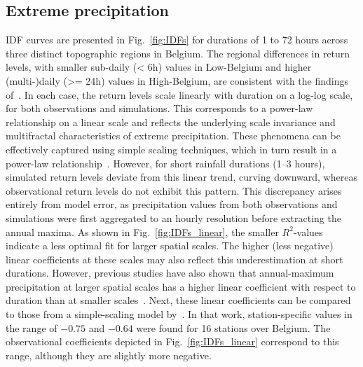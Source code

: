 \documentclass[journal abbreviation, manuscript]{copernicus}
\begin{document}
\subsection{Extreme precipitation}

IDF curves are presented in Fig.~\ref{fig:IDFs} for durations of 1 to 72 hours across three distinct topographic regions in Belgium.
The regional differences in return levels, with smaller sub-daily (< 6h) values in Low-Belgium and higher (multi-)daily (>= 24h) values in High-Belgium, are consistent with the findings of~\citet{van_de_vyver_practical_2013}.
In each case, the return levels scale linearly with duration on a log-log scale, for both observations and simulations.
This corresponds to a power-law relationship on a linear scale and reflects the underlying scale invariance and multifractal characteristics of extreme precipitation.
These phenomena can be effectively captured using simple scaling techniques, which in turn result in a power-law relationship~\citep{gupta_multiscaling_1990, veneziano_multifractality_2002}.
However, for short rainfall durations (1--3 hours), simulated return levels deviate from this linear trend, curving downward, whereas observational return levels do not exhibit this pattern.
This discrepancy arises entirely from model error, as precipitation values from both observations and simulations were first aggregated to an hourly resolution before extracting the annual maxima.
As shown in Fig.~\ref{fig:IDFs_linear}, the smaller $R^2$-values indicate a less optimal fit for larger spatial scales.
The higher (less negative) linear coefficients at these scales may also reflect this underestimation at short durations.
However, previous studies have also shown that annual-maximum precipitation at larger spatial scales has a higher linear coefficient with respect to duration than at smaller scales~\citep{innocenti_observed_2019}.
Next, these linear coefficients can be compared to those from a simple-scaling model by~\citet{van_de_vyver_multiscalingbased_2018}.
In that work, station-specific values in the range of $-0.75$ and $-0.64$ were found for 16 stations over Belgium.
The observational coefficients depicted in Fig.~\ref{fig:IDFs_linear} correspond to this range, although they are slightly more negative.
\end{document}
